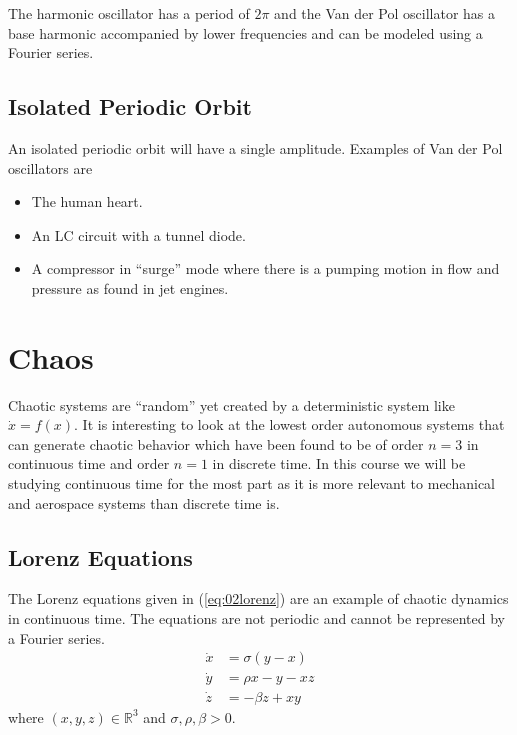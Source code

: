The harmonic oscillator has a period of $2\pi$ and the Van der Pol oscillator has a base harmonic accompanied by lower frequencies and can be modeled using a Fourier series.

\subsection{Isolated Periodic Orbit}
An isolated periodic orbit will have a single amplitude. Examples of Van der Pol oscillators are
\begin{itemize}
\item The human heart.
\item An LC circuit with a tunnel diode.
\item A compressor in ``surge'' mode where there is a pumping motion in flow and pressure as found in jet engines.
\end{itemize}

\section{Chaos}
Chaotic systems are ``random'' yet created by a deterministic system like $\dot{x}=f(x)$. It is interesting to look at the lowest order autonomous systems that can generate chaotic behavior which have been found to be of order $n=3$ in continuous time and order $n=1$ in discrete time. In this course we will be studying continuous time for the most part as it is more relevant to mechanical and aerospace systems than discrete time is.

\subsection{Lorenz Equations}
The Lorenz equations given in (\ref{eq:02lorenz}) are an example of chaotic dynamics in continuous time. The equations are not periodic and cannot be represented by a Fourier series.
\begin{align}
\label{eq:02lorenz}
\dot{x} &= \sigma(y - x) \nonumber \\
\dot{y} &= \rho x - y - xz \\
\dot{z} &= -\beta z + xy \nonumber
\end{align}
where $(x,y,z)\in\mathbb{R}^3$ and $\sigma, \rho, \beta > 0$.


